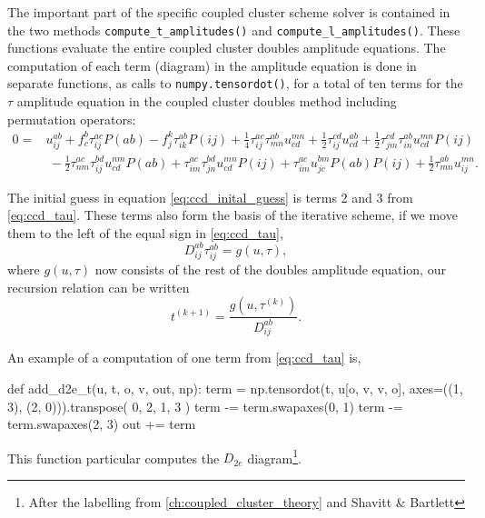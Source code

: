     The important part of the specific coupled cluster scheme solver is contained in the two 
    methods \lstinline{compute_t_amplitudes()} and \lstinline{compute_l_amplitudes()}.
    These functions evaluate the entire coupled cluster doubles amplitude equations.
    The computation of each term (diagram) in the amplitude equation is done in separate functions,
    as calls to \lstinline{numpy.tensordot()}, for a total of ten terms for the 
    $\tau$ amplitude equation in the coupled cluster doubles method including 
    permutation operators:
    \begin{equation}
        \label{eq:ccd_tau}
        \begin{aligned}
        0 =& u^{ab}_{ij} + f^b_c \tau^{ac}_{ij}P(ab) 
            - f^k_j \tau^{ab}_{ik}P(ij)
            + \frac{1}{4} \tau^{ac}_{ij} \tau^{ab}_{mn}u^{mn}_{cd} 
            + \frac{1}{2} \tau^{cd}_{ij}u^{ab}_{cd}
            + \frac{1}{2} \tau^{cd}_{jm} \tau^{ab}_{in} u^{mn}_{cd}P(ij) \\
            &\ - \frac{1}{2} \tau^{ac}_{nm} \tau^{bd}_{ij} u^{nm}_{cd}P(ab)
            + \tau^{ac}_{im} \tau^{bd}_{jn}u^{mn}_{cd}P(ij)
            + \tau^{ac}_{im}u^{bm}_{jc}P(ab)P(ij)
            + \frac{1}{2} \tau^{ab}_{mn}u^{mn}_{ij}.
        \end{aligned}
    \end{equation}

    
   
    The initial guess in equation \autoref{eq:ccd_inital_guess} is terms 2 and 3
    from \autoref{eq:ccd_tau}. These terms also form the basis of the iterative scheme,
    if we move them to the left of the equal sign in \autoref{eq:ccd_tau}, 
    \begin{equation}
        D^{ab}_{ij} \tau^{ab}_{ij} = g(u, \tau),
    \end{equation}
    where $g(u, \tau)$ now consists of the rest of the doubles amplitude equation, our 
    recursion relation can be written
    \begin{equation}
        t^{(k+1)} = \frac{g(u,\tau^{(k)})}{D^{ab}_{ij}}.
    \end{equation}
    
    An example of a computation of one term from \autoref{eq:ccd_tau} is,
    \begin{python}
    def add_d2e_t(u, t, o, v, out, np):
        term = np.tensordot(t, u[o, v, v, o], axes=((1, 3), (2, 0))).transpose(
            0, 2, 1, 3
        )
        term -= term.swapaxes(0, 1)
        term -= term.swapaxes(2, 3)
        out += term
    \end{python}
    This function particular computes the $D_{2e}$ diagram\footnote{After the labelling from 
    \autoref{ch:coupled_cluster_theory} and Shavitt \& Bartlett\cite{shavitt2009many}}.

